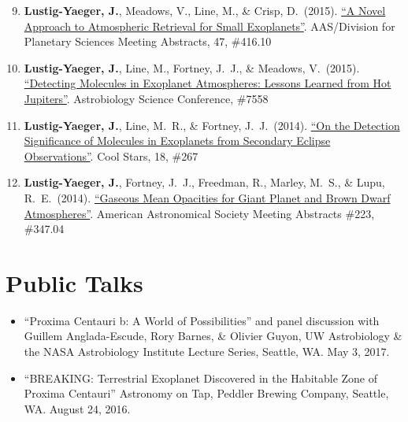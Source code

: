 \documentclass[margin,10pt]{res}
\newenvironment{benumerate}[1]{
    \let\oldItem\item
    \def\item{\addtocounter{enumi}{-2}\oldItem}
    \begin{enumerate}
    \setcounter{enumi}{#1}
    \addtocounter{enumi}{1}
}{
    \end{enumerate}
}
\begin{document}
\begin{resume}
\begin{benumerate}{8}
{                    Applications to Directly Imaged Habitable Exoplanets''}. Exoplanets I
                    \item \textbf{Lustig-Yaeger, J.}, Meadows, V., Line, M., \& Crisp, D.\ (2015). \href{http://adsabs.harvard.edu/abs/2015DPS....4741610L}{``A Novel Approach to Atmospheric Retrieval for Small Exoplanets''}. AAS/Division for Planetary Sciences Meeting Abstracts, 47, \#416.10
                    \item \textbf{Lustig-Yaeger, J.}, Line, M., Fortney, J.~J., \& Meadows, V.\ (2015). \href{http://www.hou.usra.edu/meetings/abscicon2015/pdf/7558.pdf}{``Detecting Molecules in Exoplanet Atmospheres: Lessons Learned from Hot Jupiters''}. Astrobiology Science Conference, \#7558
                    \item \textbf{Lustig-Yaeger, J.},  Line, M.~R., \& Fortney, J.~J.\ (2014). \href{http://www2.lowell.edu/workshops/coolstars18/abstracts-posters/poster-abstract-267.html}{``On the Detection Significance of Molecules in Exoplanets from Secondary Eclipse Observations''}. Cool Stars, 18, \#267
                    \item \textbf{Lustig-Yaeger, J.}, Fortney, J.~J., Freedman, R., Marley, M.~S., \& Lupu, R.~E.\ (2014). \href{http://adsabs.harvard.edu/abs/2014AAS...22334704L}{``Gaseous Mean Opacities for Giant Planet and Brown Dwarf Atmospheres''}. American Astronomical Society Meeting Abstracts \#223, \#347.04\\
                 \end{benumerate}
                 
 \section{Public Talks}
                \begin{itemize}  
                    \item ``Proxima Centauri b: A World of Possibilities'' and panel discussion with Guillem Anglada-Escude, Rory Barnes, \& Olivier Guyon, UW Astrobiology \& the NASA Astrobiology Institute Lecture Series, Seattle, WA. May 3, 2017.
                    \item ``BREAKING: Terrestrial Exoplanet Discovered in the Habitable Zone of Proxima Centauri'' Astronomy on Tap, Peddler Brewing Company, Seattle, WA. August 24, 2016.\\
                 \end{itemize}
                 

\end{resume}
\end{document}
